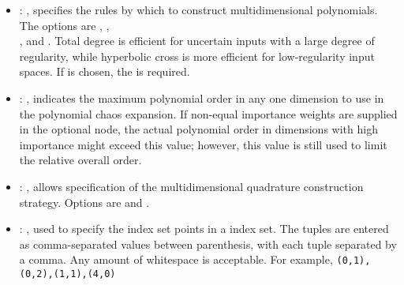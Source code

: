 \begin{itemize}
    \item {}: , 
      specifies the rules by which to construct multidimensional polynomials.  The options are
      , ,\\
      , and .
      Total degree is efficient for                                                  uncertain
      inputs with a large degree of regularity, while hyperbolic cross is more efficient
      for low-regularity input spaces.                                                  If
       is chosen, the  is required.

    \item {}: , 
      indicates the maximum polynomial order in any one dimension to use in the
      polynomial chaos expansion. \nb If non-equal importance weights are supplied in the optional
       node, the actual polynomial order in dimensions with high
      importance might exceed this value; however, this value is still used to limit the
      relative overall order.

    \item {}: , 
      allows specification of the multidimensional
      quadrature construction strategy.  Options are  and .

    \item {}: , 
      used to specify the index set points in a  index set.  The tuples are
      entered as comma-separated values between parenthesis, with each tuple separated by a comma.
      Any amount of whitespace is acceptable.  For example,
      \verb'(0,1),(0,2),(1,1),(4,0)'


\end{itemize}
